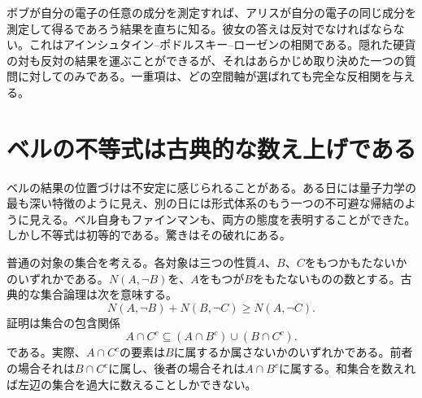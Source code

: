 \begin{classroomqa}
\end{classroomqa}

ボブが自分の電子の任意の成分を測定すれば、アリスが自分の電子の同じ成分を測定して得るであろう結果を直ちに知る。彼女の答えは反対でなければならない。これはアインシュタイン--ポドルスキー--ローゼンの相関である。隠れた硬貨の対も反対の結果を運ぶことができるが、それはあらかじめ取り決めた一つの質問に対してのみである。一重項は、どの空間軸が選ばれても完全な反相関を与える。

\begin{classroomqa}
\end{classroomqa}

\begin{classroomqa}
\end{classroomqa}

\section{ベルの不等式は古典的な数え上げである}

ベルの結果の位置づけは不安定に感じられることがある。ある日には量子力学の最も深い特徴のように見え、別の日には形式体系のもう一つの不可避な帰結のように見える。ベル自身もファインマンも、両方の態度を表明することができた。しかし不等式は初等的である。驚きはその破れにある。

普通の対象の集合を考える。各対象は三つの性質\(A\)、\(B\)、\(C\)をもつかもたないかのいずれかである。\(N(A,\neg B)\)を、\(A\)をもつが\(B\)をもたないものの数とする。古典的な集合論理は次を意味する。
\begin{equation}
  N(A,\neg B)+N(B,\neg C)
  \geq
  N(A,\neg C).
  \label{eq:l05-bell-count}
\end{equation}
証明は集合の包含関係
\begin{equation}
  A\cap C^{c}
  \subseteq
  (A\cap B^{c})\cup(B\cap C^{c}).
  \label{eq:l05-set-inclusion}
\end{equation}
である。実際、\(A\cap C^c\)の要素は\(B\)に属するか属さないかのいずれかである。前者の場合それは\(B\cap C^c\)に属し、後者の場合それは\(A\cap B^c\)に属する。和集合を数えれば左辺の集合を過大に数えることしかできない。

